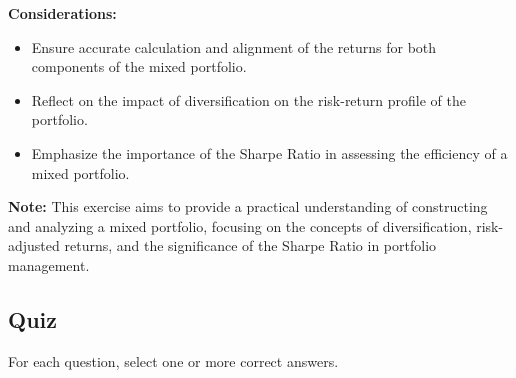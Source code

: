 \documentclass{article}
\begin{document}
\textbf{Considerations:}
\begin{itemize}
    \item Ensure accurate calculation and alignment of the returns for both components of the mixed portfolio.
    \item Reflect on the impact of diversification on the risk-return profile of the portfolio.
    \item Emphasize the importance of the Sharpe Ratio in assessing the efficiency of a mixed portfolio.
\end{itemize}

\textbf{Note:} This exercise aims to provide a practical understanding of constructing and analyzing a mixed portfolio, focusing on the concepts of diversification, risk-adjusted returns, and the significance of the Sharpe Ratio in portfolio management.

\subsection{Quiz}
For each question, select one or more correct answers.
\end{document}
